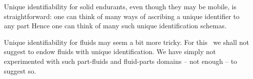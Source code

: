 \mnewfoil\HHHH
\begynd
\pind Unique identifiability for solid endurants,
\begynd
\pind even though they may be mobile, 
\pind is straightforward:
\begynd
\pind one can think of many ways  
\pind of ascribing a unique identifier to any part
\afslut
\afslut
\pind Hence one can think of many such unique identification schemas.
\afslut

\mnewfoil
\begynd
\pind Unique identifiability for fluids may seem a bit more tricky.
\begynd
\pind For this \monograph\ we shall not suggest
\pind to endow fluids with unique identification.
\pind We have simply not experimented with such \nyl
      part-fluids and fluid-parts domains \nyl
      -- not enough -- to suggest so. 
\afslut
\afslut

\label{kap4.Uniqueness Modeling Tools}
 
